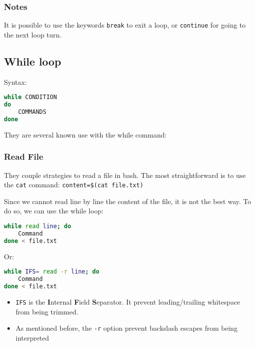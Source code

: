 \documentclass{article}
\newcommand{\inlinecode}[1]{\colorbox{backcolour}{\footnotesize{\texttt{#1}}}}
\begin{document}
\subsubsection{Notes}
It is possible to use the keywords \inlinecode{break} to exit a loop, or \inlinecode{continue} for going to the next loop turn.

\subsection{While loop}

Syntax:
\begin{lstlisting}[style=command, language=bash]
while CONDITION
do
    COMMANDS
done
\end{lstlisting}
They are several known use with the while command:

\subsubsection{Read File}

They couple strategies to read a file in bash. The most straightforward is to use the \inlinecode{cat} command: \inlinecode{content=\$(cat file.txt)}

Since we cannot read line by line the content of the file, it is not the best way. To do so, we can use the while loop:

\begin{lstlisting}[style=command, language=bash]
while read line; do
    Command
done < file.txt
\end{lstlisting}

Or:

\begin{paracol}{2}
	\begin{lstlisting}[style=command, language=bash]
while IFS= read -r line; do
    Command
done < file.txt
\end{lstlisting}

	\switchcolumn

	\footnotesize{
		\begin{itemize}
			\item \inlinecode{IFS} is the \textbf{I}nternal \textbf{F}ield \textbf{S}eparator. It prevent leading/trailing whitespace from being trimmed.
			\item As mentioned before, the \inlinecode{-r} option prevent backslash escapes from being interpreted
		\end{itemize}
	}

\end{paracol}
\end{document}
